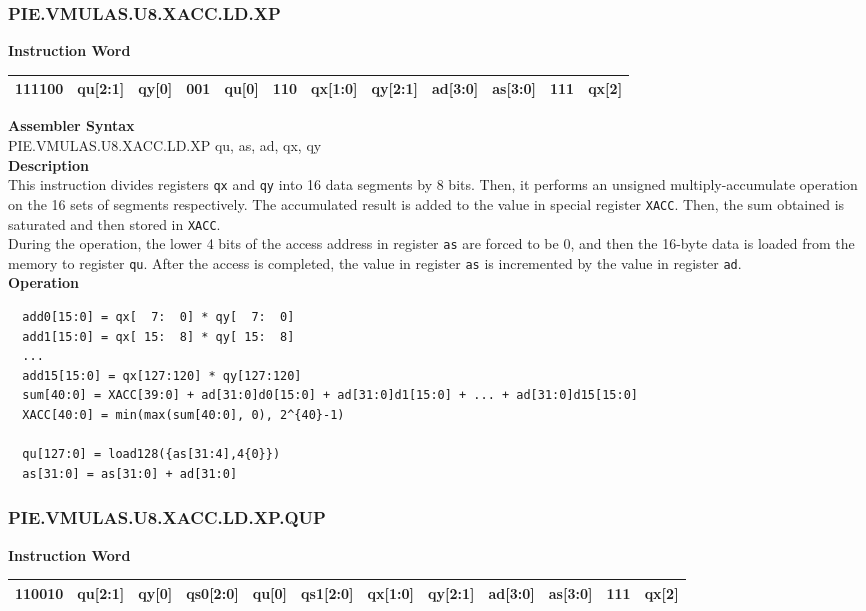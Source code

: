 \newpage
\subsubsection{PIE.VMULAS.U8.XACC.LD.XP}\label{instruction:PIEVMULASU8XACCLDXP}
\setlength\tabcolsep{6pt}
\textbf{Instruction Word} \\
\begin{tabular}{|c|c|c|c|c|c|c|c|c|c|c|c|}
	\hline
	111100 & qu[2:1] & qy[0] & 001 & qu[0] & 110 & qx[1:0] & qy[2:1] & ad[3:0] & as[3:0] & 111 & qx[2] \\
	\hline
\end{tabular}

\textbf{Assembler Syntax} \\
PIE.VMULAS.U8.XACC.LD.XP qu, as, ad, qx, qy \\
\textbf{Description} \\
This instruction divides registers \lstinline{qx} and \lstinline{qy} into 16 data segments by 8 bits. Then, it performs an unsigned multiply-accumulate operation on the 16 sets of segments respectively. The accumulated result is added to the value in special register \lstinline{XACC}. Then, the sum obtained is saturated and then stored in \lstinline{XACC}.\\
During the operation, the lower 4 bits of the access address in register \lstinline{as} are forced to be 0, and then the 16-byte data is loaded from the memory to register \lstinline{qu}. After the access is completed, the value in register \lstinline{as} is incremented by the value in register \lstinline{ad}.\\
\textbf{Operation}
\begin{lstlisting}
  add0[15:0] = qx[  7:  0] * qy[  7:  0]
  add1[15:0] = qx[ 15:  8] * qy[ 15:  8]
  ...
  add15[15:0] = qx[127:120] * qy[127:120]
  sum[40:0] = XACC[39:0] + ad[31:0]d0[15:0] + ad[31:0]d1[15:0] + ... + ad[31:0]d15[15:0]
  XACC[40:0] = min(max(sum[40:0], 0), 2^{40}-1)

  qu[127:0] = load128({as[31:4],4{0}})
  as[31:0] = as[31:0] + ad[31:0]
\end{lstlisting}

\newpage
\subsubsection{PIE.VMULAS.U8.XACC.LD.XP.QUP}\label{instruction:PIEVMULASU8XACCLDXPQUP}
\setlength\tabcolsep{6pt}
\textbf{Instruction Word} \\
\begin{tabular}{|c|c|c|c|c|c|c|c|c|c|c|c|}
	\hline
	110010 & qu[2:1] & qy[0] & qs0[2:0] & qu[0] & qs1[2:0] & qx[1:0] & qy[2:1] & ad[3:0] & as[3:0] & 111 & qx[2] \\
	\hline
\end{tabular}

